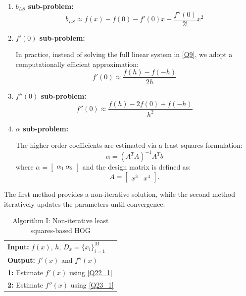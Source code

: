 \documentclass{elsarticle}
\begin{document}
\begin{enumerate}
	
	\item \textbf{$b_{LS}$ sub-problem:}
	\begin{equation}\label{Q20_1}
		b_{LS} \approx f(x)-f(0)-f'(0)x-\frac{f''(0)}{2!}x^2
	\end{equation}
	
	\item \textbf{$f'(0)$ sub-problem:}
	
	In practice, instead of solving the full linear system in \eqref{Q9}, we adopt a computationally efficient approximation:
	\begin{equation}\label{Q22_1}
		f'(0)\approx \frac{f(h)-f(-h)}{2h}
	\end{equation}
	
	\item \textbf{$f''(0)$ sub-problem:}
	\begin{equation}\label{Q23_1}
		f''(0)\approx \frac{f(h)-2f(0)+f(-h)}{h^2}
	\end{equation}
	
	\item \textbf{$\alpha$ sub-problem:}
	
	The higher-order coefficients are estimated via a least-squares formulation:
	\begin{equation}\label{Q21_1}
		\alpha = (A^{T}A)^{-1}A^{T}b
	\end{equation}
	where $\alpha=\begin{bmatrix}\alpha_1 \ \alpha_2\end{bmatrix}$ and the design matrix is defined as:
	\[
	A = \begin{bmatrix} x^3 & x^4 \end{bmatrix}.
	\]
	
\end{enumerate}

The first method provides a non-iterative solution, while the second method iteratively updates the parameters until convergence.

\begin{table}[t]
	\centering
	\caption{Algorithm I: Non-iterative least squares-based HOG}
	\label{my-labelI}
	
	\begin{tabular}{l}
		\hline
		\textbf{Input:} $f(x)$, $h$, $D_x=\{x_i\}_{i=1}^{M}$\\
		\textbf{Output:} $f'(x)$ and $f''(x)$\\
		\hline
		\textbf{1:} Estimate $f'(x)$ using \eqref{Q22_1}\\
		\textbf{2:} Estimate $f''(x)$ using \eqref{Q23_1}\\
		\hline
	\end{tabular}
	
\end{table}
\end{document}
